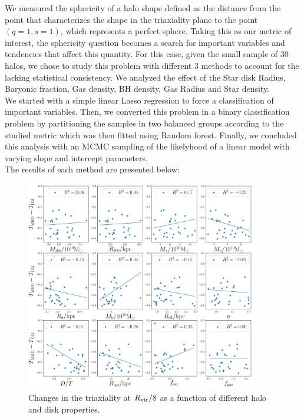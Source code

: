\documentclass[a4paper,fleqn,usenatbib]{mnras}
\begin{document}
  We measured the sphericity of a halo shape defined as the distance 
  from the point that characterizes the shape in the triaxiality plane
  to the point $(q=1,s=1)$, which represents a perfect sphere. Taking this 
  as our metric of interest, the sphericity question becomes a search for
  important variables and tendencies that affect this quantity. For this case,
  given the small sample of 30 halos, we chose to study this problem with different 
  3 methods to account for the lacking statistical consistency. We analyzed the effect
  of the Star disk Radius, Baryonic fraction, Gas density, BH density, Gas Radius and
  Star density.\\
   
  We started with a simple linear Lasso regression to force a classification of 
  important variables. Then, we converted this problem in a binary classification problem
  by partitioning the samples in two balanced groups according to the studied metric which was then fitted using Random forest.
  Finally, we concluded this analysis with an MCMC sampling of the likelyhood of a linear model
  with varying slope and intercept parameters.\\
  
  The results of each method are presented below:
  
\begin{figure}
\centering
\includegraphics[width=0.9\textwidth]{delta_T_correlations.pdf}
\caption{Changes in the triaxiality at $R_{\rm vir}/8$ as a function of different halo and disk properties.}
\label{fig:sphericity}
\end{figure}    
\end{document}
